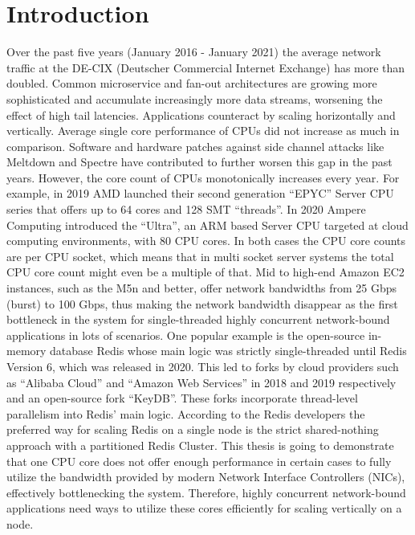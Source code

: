 \chapter{Introduction}
Over the past five years (January 2016 - January 2021) the average network traffic at the DE-CIX (Deutscher Commercial Internet Exchange) has more than doubled. Common microservice and fan-out architectures are growing more sophisticated and accumulate increasingly more data streams, worsening the effect of high tail latencies. Applications counteract by scaling horizontally and vertically. Average single core performance of CPUs did not increase as much in comparison. Software and hardware patches against side channel attacks like Meltdown and Spectre have contributed to further worsen this gap in the past years. However, the core count of CPUs monotonically increases every year.  \newline
For example, in 2019 AMD launched their second generation “EPYC” Server CPU series that offers up to 64 cores and 128 SMT “threads”. In 2020 Ampere Computing introduced the “Ultra”, an ARM based Server CPU targeted at cloud computing environments, with 80 CPU cores. In both cases the CPU core counts are per CPU socket, which means that in multi socket server systems the total CPU core count might even be a multiple of that.  \newline
Mid to high-end Amazon EC2 instances, such as the M5n and better, offer network bandwidths from 25 Gbps (burst) to 100 Gbps, thus making the network bandwidth disappear as the first bottleneck in the system for single-threaded highly concurrent network-bound applications in lots of scenarios. \newline
One popular example is the open-source in-memory database Redis whose main logic was strictly single-threaded until Redis Version 6, which was released in 2020. This led to forks by cloud providers such as “Alibaba Cloud” and “Amazon Web Services” \cite{alibaba:redis, aws:redis} in 2018 and 2019 respectively and an open-source fork “KeyDB”. These forks incorporate thread-level parallelism into Redis’ main logic. \newline
According to the Redis developers the preferred way for scaling Redis on a single node is the strict shared-nothing approach with a partitioned Redis Cluster. \newline
This thesis is going to demonstrate that one CPU core does not offer enough performance in certain cases to fully utilize the bandwidth provided by modern Network Interface Controllers (NICs), effectively bottlenecking the system. Therefore, highly concurrent network-bound applications need ways to utilize these cores efficiently for scaling vertically on a node. \newline
